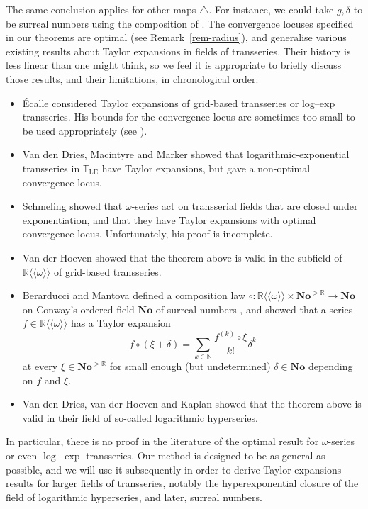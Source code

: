\documentclass{article}
\newcommand{\llangle}{{\langle\!\langle}}
\newcommand{\of}{:}
\newcommand{\rrangle}{{\rangle\!\rangle}}
\newcommand{\tmop}[1]{\ensuremath{\operatorname{#1}}}
\newenvironment{itemizedot}{\begin{itemize} \renewcommand{\labelitemi}{$\bullet$}\renewcommand{\labelitemii}{$\bullet$}\renewcommand{\labelitemiii}{$\bullet$}\renewcommand{\labelitemiv}{$\bullet$}}{\end{itemize}}
\theoremstyle{remark}\newtheorem*{convention*}{Convention}
\begin{document}
The same conclusion applies for other maps $\triangle$. For instance, we could
take $g, \delta$ to be surreal numbers using the composition of {\cite{BM19}}.
The convergence locuses specified in our theorems are optimal (see
Remark~\ref{rem-radius}), and generalise various existing results about Taylor
expansions in fields of transseries. Their history is less linear than one
might think, so we feel it is appropriate to briefly discuss those results,
and their limitations, in chronological order:
\begin{itemizedot}
  \item {\'E}calle {\cite[4.1.26bis]{Ec92}} considered Taylor expansions of
  grid-based transseries or log--exp transseries. His bounds for the
  convergence locus are sometimes too small to be used appropriately (see
  {\cite[(6.32)]{vdDMM01}}).
  
  \item Van den Dries, Macintyre and Marker {\cite[(6.8)-(4)]{vdDMM01}} showed
  that logarithmic-exponential transseries in $\mathbb{T}_{\tmop{LE}}$ have
  Taylor expansions, but gave a non-optimal convergence locus.
  
  \item Schmeling {\cite[Section~6]{Schm01}} showed that $\omega$-series act
  on transserial fields that are closed under exponentiation, and that they
  have Taylor expansions with optimal convergence locus. Unfortunately, his
  proof is incomplete.
  
  \item Van der Hoeven {\cite[Proposition~5.11(c)]{vdH:ln}} showed that the
  theorem above is valid in the subfield of $\mathbb{R} \llangle \omega
  \rrangle$ of grid-based transseries.
  
  \item Berarducci and Mantova defined {\cite[Theorem~6.3]{BM19}} a
  composition law $\mathord{\circ} \of \mathbb{R} \llangle \omega \rrangle
  \times \mathbf{No}^{>\mathbb{R}} \longrightarrow \mathbf{No}$ on Conway's
  ordered field $\mathbf{No}$ of surreal numbers {\cite{Con76}}, and showed
  {\cite[Theorem~7.5]{BM19}} that a series $f \in \mathbb{R} \llangle \omega
  \rrangle$ has a Taylor expansion
  \[ f \circ (\xi + \delta) = \sum_{k \in \mathbb{N}} \frac{f^{(k)} \circ
     \xi}{k!} \delta^k \]
  at every $\xi \in \mathbf{No}^{>\mathbb{R}}$ for small enough (but
  undetermined) $\delta \in \mathbf{No}$ depending on $f$ and $\xi$.
  
  \item Van den Dries, van der Hoeven and Kaplan
  {\cite[Proposition~8.1]{vdH:loghyp}} showed that the theorem above is valid
  in their field of so-called logarithmic hyperseries.
\end{itemizedot}
In particular, there is no proof in the literature of the optimal result for
$\omega$-series or even $\log$-$\exp$ transseries. Our method is designed to
be as general as possible, and we will use it subsequently in order to derive
Taylor expansions results for larger fields of transseries, notably the
hyperexponential closure {\cite{BvdHK:hyp}} of the field of logarithmic
hyperseries, and later, surreal numbers.
\end{document}
